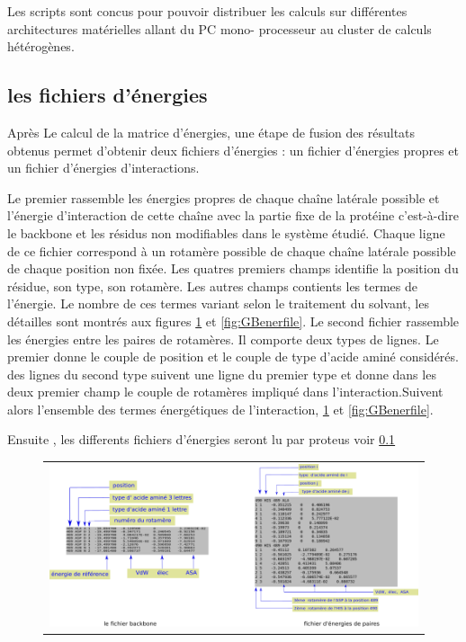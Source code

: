 \begin{enumerate}
Les scripts sont concus pour pouvoir distribuer les calculs sur différentes architectures matérielles allant du PC mono- processeur au cluster de calculs hétérogènes.

\subsection{les fichiers d'énergies}

Après Le calcul de la matrice d'énergies, une étape de fusion des résultats obtenus permet d'obtenir deux fichiers d'énergies : un fichier d'énergies propres et un fichier d'énergies d'interactions.

Le premier rassemble les énergies propres de chaque chaîne latérale possible et l'énergie d'interaction de cette chaîne avec la partie fixe de la protéine c'est-à-dire le backbone et les résidus non modifiables dans le système étudié. Chaque ligne de ce fichier correspond à un rotamère possible de chaque chaîne latérale possible de chaque position non fixée. Les quatres premiers champs identifie la position du résidue, son type, son rotamère. Les autres champs contients les termes de l'énergie. Le nombre de ces termes variant selon le traitement du solvant, les détailles sont montrés aux figures \ref{fig:CAenerfile} et \ref{fig:GBenerfile}.   
Le second fichier rassemble les énergies entre les paires de rotamères. Il comporte deux types de lignes. Le premier donne le couple de position et le couple de type d'acide aminé considérés. des lignes du second type suivent une ligne du premier type et donne dans les deux premier champ le couple de rotamères impliqué dans l'interaction.Suivent alors l'ensemble des termes énergétiques de l'interaction, \ref{fig:CAenerfile} et \ref{fig:GBenerfile}. 


Ensuite , les differents fichiers d'énergies seront lu par proteus voir \ref{} 


   \begin{figure}[!htbp]
     \centering
     \begin{tabular}{c}
       \includegraphics[width=12cm]{figure/proteus/inputener.png} 
     \end{tabular}     
     \caption{}
\label{fig:CAenerfile}
   \end{figure}



\end{enumerate}
